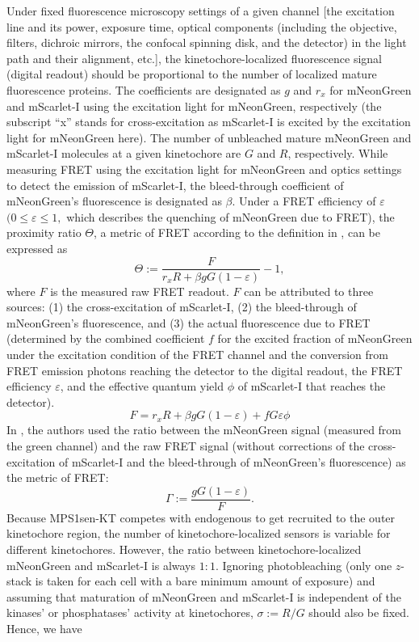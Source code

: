 Under fixed fluorescence microscopy settings of a given channel [the excitation line and its power, exposure time, optical components (including the objective, filters, dichroic mirrors, the confocal spinning disk, and the detector) in the light path and their alignment, etc.], the kinetochore-localized fluorescence signal (digital readout) should be proportional to the number of localized mature fluorescence proteins. The coefficients are designated as $g$ and $r_x$ for mNeonGreen and mScarlet-I using the excitation light for mNeonGreen, respectively (the subscript ``x'' stands for cross-excitation 
as mScarlet-I is excited by the excitation light for mNeonGreen here). The number of unbleached mature mNeonGreen and mScarlet-I molecules at a given kinetochore are $G$ and $R$, respectively. While measuring FRET using the excitation light for mNeonGreen and optics settings to detect the emission of mScarlet-I, the bleed-through coefficient of mNeonGreen's fluorescence is designated as $\beta$. Under a FRET efficiency of $\varepsilon$ $(0 \leq \varepsilon \leq 1,$ which describes the quenching of mNeonGreen due to FRET), the proximity ratio $\Theta$, a metric of FRET according to the definition in \cite{HeLaFRETGUI}, can be expressed as
\begin{equation*}
    \Theta := \dfrac{F}{r_xR + \beta gG(1 - \varepsilon)} - 1,
\end{equation*}
where $F$ is the measured raw FRET readout. $F$ can be attributed to three sources: (1) the cross-excitation of mScarlet-I, (2) the bleed-through of mNeonGreen's fluorescence, and (3) the actual fluorescence due to FRET (determined by the combined coefficient $f$ for the excited fraction of mNeonGreen under the excitation condition of the FRET channel and the conversion from FRET emission photons reaching the detector to the digital readout, the FRET efficiency $\varepsilon$, and the effective quantum yield $\phi$ of mScarlet-I that reaches the detector).
\begin{equation*}
    F = r_xR + \beta gG(1 - \varepsilon) + fG\varepsilon\phi
\end{equation*}
In \cite{MPS1senor}, the authors used the ratio between the mNeonGreen signal (measured from the green channel) and the raw FRET signal (without corrections of the cross-excitation of mScarlet-I and the bleed-through of mNeonGreen's fluorescence) as the metric of FRET:
\begin{equation*}
    \Gamma := \dfrac{gG(1 - \varepsilon)}{F}.
\end{equation*}
Because MPS1sen-KT competes with endogenous  to get recruited to the outer kinetochore region, the number of kinetochore-localized sensors is variable for different kinetochores. However, the ratio between kinetochore-localized mNeonGreen and mScarlet-I is always $1 : 1$. Ignoring photobleaching (only one $z$-stack is taken for each cell with a bare minimum amount of exposure) and assuming that maturation of mNeonGreen and mScarlet-I is independent of the kinases' or phosphatases' activity at kinetochores, $\sigma := R/G$ should also be fixed. Hence, we have
